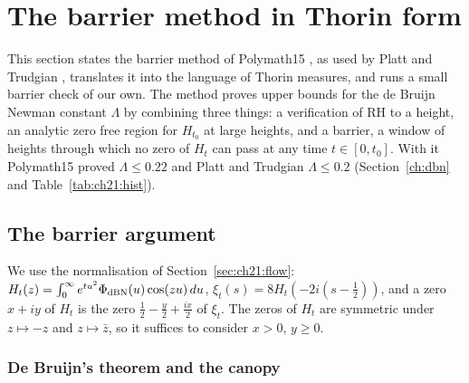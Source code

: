 
\section{The barrier method in Thorin form}\label{barrier:sec:method}

This section states the barrier method of Polymath15 \cite{Polymath}, as used by Platt and Trudgian \cite{PT21}, translates it into the language of Thorin measures, and runs a small barrier check of our own. The method proves upper bounds for the de Bruijn Newman constant $\Lambda$ by combining three things: a verification of RH to a height, an analytic zero free region for $H_{t_0}$ at large heights, and a barrier, a window of heights through which no zero of $H_t$ can pass at any time $t\in[0,t_0]$. With it Polymath15 proved $\Lambda\le0.22$ and Platt and Trudgian $\Lambda\le0.2$ (Section~\ref{ch:dbn} and Table~\ref{tab:ch21:hist}).

\subsection{The barrier argument}\label{barrier:sec:argument}

We use the normalisation of Section~\ref{sec:ch21:flow}: $H_t(z)=\int_0^\infty e^{tu^2}\Phi_{\rm dBN}(u)\cos(zu)\,du$, $\xi_t(s)=8H_t(-2i(s-\frac12))$, and a zero $x+iy$ of $H_t$ is the zero $\frac12-\frac y2+\frac{ix}2$ of $\xi_t$. The zeros of $H_t$ are symmetric under $z\mapsto-z$ and $z\mapsto\bar z$, so it suffices to consider $x>0$, $y\ge0$.

\subsubsection{De Bruijn's theorem and the canopy}

